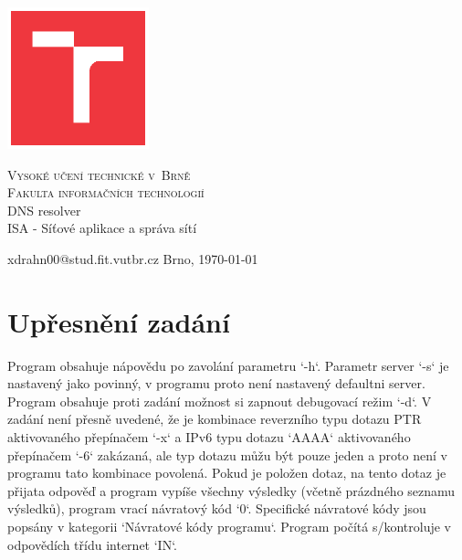 \documentclass[a4paper,11pt]{article}
\begin{document}
\begin{titlepage}

	\begin{center}

        \includegraphics[width=4.1cm,keepaspectratio,trim={1.2cm 1.2cm 1.2cm 1.2cm},clip]{./template-fig/VUT_symbol_barevne_CMYK_CZ}%

		{\Huge\textsc{Vysoké učení technické v~Brně}}\\
		\medskip
		{\huge\textsc{Fakulta informačních technologií}}\\
		{\huge DNS resolver}\\
		\medskip
		{\LARGE ISA - Síťové aplikace a správa sítí}\\
	\end{center}

    \noindent xdrahn00@stud.fit.vutbr.cz \Large {\hfill Brno, \today}

\end{titlepage}

\section{Upřesnění zadání}

Program obsahuje nápovědu po zavolání parametru `-h`. Parametr server `-s` je nastavený jako povinný, v programu proto není nastavený defaultni server. Program obsahuje proti zadání možnost si zapnout debugovací režim `-d`. V zadání není přesně uvedené, že je kombinace reverzního typu dotazu PTR aktivovaného přepínačem `-x` a IPv6 typu dotazu `AAAA` aktivovaného přepínačem `-6` zakázaná, ale typ dotazu můžu být pouze jeden a proto není v programu tato kombinace povolená. Pokud je položen dotaz, na tento dotaz je přijata odpověď a program vypíše všechny výsledky (včetně prázdného seznamu výsledků), program vrací návratový kód `0`. Specifické návratové kódy jsou popsány v kategorii `Návratové kódy programu`. Program počítá s/kontroluje v odpovědích třídu internet `IN`.
\end{document}
